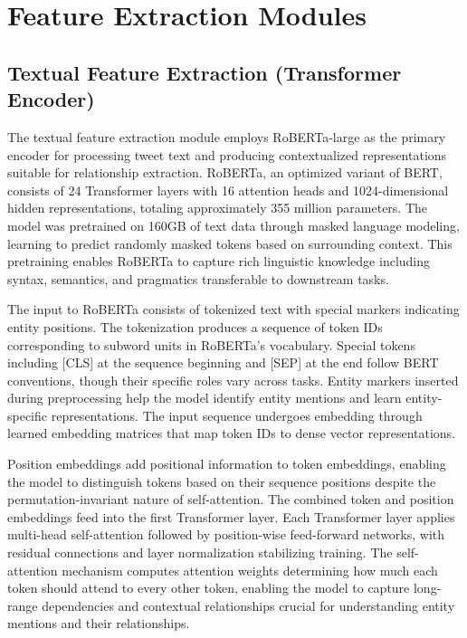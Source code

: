 \documentclass[12pt,a4paper]{report}
\begin{document}
\section{Feature Extraction Modules}

\subsection{Textual Feature Extraction (Transformer Encoder)}

The textual feature extraction module employs RoBERTa-large as the primary encoder for processing tweet text and producing contextualized representations suitable for relationship extraction. RoBERTa, an optimized variant of BERT, consists of 24 Transformer layers with 16 attention heads and 1024-dimensional hidden representations, totaling approximately 355 million parameters. The model was pretrained on 160GB of text data through masked language modeling, learning to predict randomly masked tokens based on surrounding context. This pretraining enables RoBERTa to capture rich linguistic knowledge including syntax, semantics, and pragmatics transferable to downstream tasks.

The input to RoBERTa consists of tokenized text with special markers indicating entity positions. The tokenization produces a sequence of token IDs corresponding to subword units in RoBERTa's vocabulary. Special tokens including [CLS] at the sequence beginning and [SEP] at the end follow BERT conventions, though their specific roles vary across tasks. Entity markers inserted during preprocessing help the model identify entity mentions and learn entity-specific representations. The input sequence undergoes embedding through learned embedding matrices that map token IDs to dense vector representations.

Position embeddings add positional information to token embeddings, enabling the model to distinguish tokens based on their sequence positions despite the permutation-invariant nature of self-attention. The combined token and position embeddings feed into the first Transformer layer. Each Transformer layer applies multi-head self-attention followed by position-wise feed-forward networks, with residual connections and layer normalization stabilizing training. The self-attention mechanism computes attention weights determining how much each token should attend to every other token, enabling the model to capture long-range dependencies and contextual relationships crucial for understanding entity mentions and their relationships.
\end{document}
